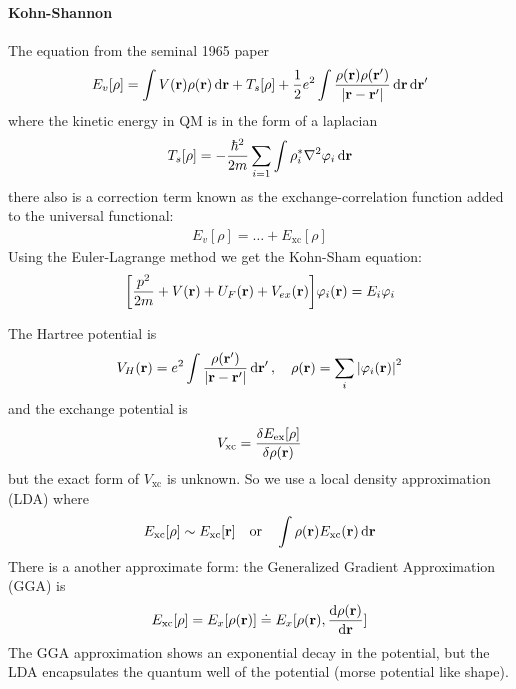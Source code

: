 \documentclass[../main.tex]{subfiles}
\begin{document}
\paragraph*{Kohn-Shannon}
The equation from the seminal 1965 paper 
\begin{align*}
    E_v[\rho] = \int V(\vb r) \rho(\vb r) \dd{\vb r} + T_s[\rho] 
    + \frac{1}{2} e^2 \int \frac{\rho(\vb r) \rho(\vb r')}{\abs{\vb r - \vb r'}} \dd{\vb r} \dd{\vb r'}
\end{align*}
where the kinetic energy in QM is in the form of a laplacian
\begin{align*}
    T_s[\rho] = -\frac{\hbar^2}{2m} \sum_{i=1} \int \rho_i^* \laplacian \varphi_i  \dd{\vb r}
\end{align*}
there also is a correction term known as the exchange-correlation function added to the universal
functional:
\begin{align*}
    E_v[\rho] = \dots + E_{\text{xc}}[\rho]
\end{align*}
Using the Euler-Lagrange method we get the Kohn-Sham equation:
\begin{align*}
    \qt[\frac{p^2}{2m} + V (\vb r) + U_F (\vb r) + V_{ex}(\vb r)] \varphi_i (\vb r) = E_i \varphi_i
\end{align*}

\newpage
{}
The Hartree potential is
\begin{align*}
    V_H (\vb r) = e^2 \int \frac{\rho(\vb r')}{\abs{\vb r - \vb r'}} \dd{\vb r'},\quad 
    \rho (\vb r) = \sum_i \abs{\varphi_i (\vb r)}^2
\end{align*}
and the exchange potential is
\begin{align*}
    V_{\text{xc}} = \frac{\delta E_{\text{ex}}[\rho]}{\delta \rho(\vb r)}
\end{align*}
but the exact form of $V_{\text{xc}}$ is unknown. So we use a local density approximation (LDA) where
\begin{align*}
    E_{\text{xc}}[\rho] \sim E_{\text{xc}}[\vb r] \qor \int \rho(\vb r) E_{\text{xc}}(\vb r) \dd{\vb r}
\end{align*}
There is a another approximate form: the Generalized Gradient Approximation (GGA) is
\begin{align*}
    E_{\text{xc}}[\rho] = E_x[\rho(\vb r)] \doteq E_x[\rho(\vb r), \dv{\rho(\vb r)}{\vb r}]
\end{align*}
The GGA approximation shows an exponential decay in the potential, but the LDA encapsulates the
quantum well of the potential (morse potential like shape). 
\end{document}
